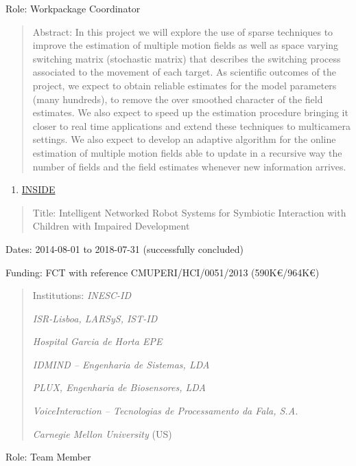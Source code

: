 Role: Workpackage Coordinator

\begin{quote}
Abstract: In this project we will explore the use of sparse techniques
to improve the estimation of multiple motion fields as well as space
varying switching matrix (stochastic matrix) that describes the
switching process associated to the movement of each target. As
scientific outcomes of the project, we expect to obtain reliable
estimates for the model parameters (many hundreds), to remove the over
smoothed character of the field estimates. We also expect to speed up
the estimation procedure bringing it closer to real time applications
and extend these techniques to multicamera settings. We also expect to
develop an adaptive algorithm for the online estimation of multiple
motion fields able to update in a recursive way the number of fields and
the field estimates whenever new information arrives.
\end{quote}

\begin{enumerate}
\def\labelenumi{\arabic{enumi}.}
\setcounter{enumi}{8}
\item
  \ul{INSIDE}
\end{enumerate}

\begin{quote}
Title: Intelligent Networked Robot Systems for Symbiotic Interaction
with Children with Impaired Development
\end{quote}

Dates: 2014-08-01 to 2018-07-31 (successfully concluded)

Funding: FCT with reference CMUP­ERI/HCI/0051/2013 (590K€/964K€)

\begin{quote}
Institutions: \emph{INESC-ID}

\emph{ISR-Lisboa, LARSyS, IST-ID}

\emph{Hospital Garcia de Horta EPE}

\emph{IDMIND -- Engenharia de Sistemas, LDA}

\emph{PLUX, Engenharia de Biosensores, LDA}

\emph{VoiceInteraction -- Tecnologias de Processamento da Fala, S.A.}

\emph{Carnegie Mellon University} (US)
\end{quote}

Role: Team Member

